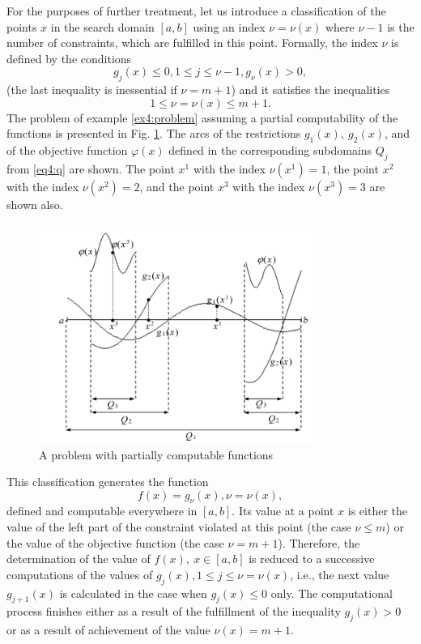 \documentclass[graybox]{svmult}
\begin{document}
For the purposes of further treatment, let us introduce a classification of the points $x$ in the search domain $[a,b]$ using an index $\nu=\nu(x)$ where $\nu-1$ is the number of constraints, which are fulfilled in this point. Formally, the index $\nu$ is defined by the conditions
\begin{equation}
  \label{eq4:condition}
  g_j(x)\le 0,1\le j \le \nu-1,g_\nu(x)>0,
\end{equation}
(the last inequality is inessential  if $\nu=m+1$) and it satisfies the inequalities
\begin{displaymath}
  1\le\nu=\nu(x)\le m+1.
\end{displaymath}
The problem of example \ref{ex4:problem} assuming a partial computability of the functions is presented in Fig. \ref{fig:4_2}. The arcs of the restrictions $g_1(x),\:g_2(x)$, and of the objective function $\varphi(x)$ defined in the corresponding subdomains $Q_j$ from \eqref{eq4:q} are shown. The point $x^1$ with the index $\nu(x^1)=1$, the point $x^2$ with the index $\nu(x^2)=2$, and the point $x^3$ with the index $\nu(x^3)=3$ are shown also.

\begin{figure}[h]
  \label{fig:4_2}
  \centering
  \includegraphics[width=0.8\textwidth]{figures/4_2.png}
  \caption{A problem with partially computable functions}
\end{figure}

This classification generates the function
\begin{equation}
  \label{eq4:fx}
  f(x)=g_\nu(x),\nu=\nu(x),
\end{equation}
defined and computable everywhere in $[a,b]$. Its value at a point $x$ is either the value of the left part of the constraint violated at this point (the case $\nu\le m$)  or the value of the objective function (the case $\nu=m+1$). Therefore, the determination of the value of $f(x),\:x\in[a,b]$  is reduced to a successive computations of the values of $g_j(x), 1\le j\le \nu=\nu(x)$, i.e., the next value $g_{j+1}(x)$ is calculated in the case when $g_j(x)\le 0$ only. The computational process finishes either as a result of the fulfillment of the inequality $g_j(x)>0$ or as a result of achievement of the value $\nu(x)=m+1$.
\end{document}
